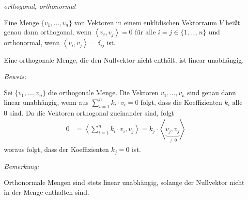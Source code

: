 
\begin{mydef}\label{orthogonal,orthonormal}\textit{orthogonal, orthonormal}

    Eine Menge $\{ v_1, \ldots, v_n \}$ von Vektoren in einem euklidischen Vektorraum $V$ heißt genau dann orthogonal,
    wenn $\left\langle v_i,v_j \right\rangle = 0$ für alle $i = j \in \{ 1, \ldots, n \}$ und orthonormal, wenn $\left\langle v_i, v_j \right\rangle = \delta_{ij}$ ist.
\end{mydef}


\begin{mylemma}
    Eine orthogonale Menge, die den Nullvektor nicht enthält, ist linear unabhängig.

    \textit{Beweis:}

    Sei $\{ v_1, \ldots, v_n \}$ die orthogonale Menge.
    Die Vektoren $v_1, \ldots, v_n$ sind genau dann linear unabhängig, wenn aus $\sum\limits_{i = 1}^n k_i \cdot v_i = 0$ folgt, dass die Koeffizienten $k_i$ alle $0$ sind.
    Da die Vektoren orthogonal zueinander sind, folgt
    \begin{align*}
        0 & = \left\langle \sum\limits_{i = 1}^n k_i \cdot v_i , v_j \right\rangle = k_j \cdot \left\langle \underbrace{v_j, v_j}_{ \neq 0} \right\rangle
    \end{align*}
    woraus folgt, dass der Koeffizienten $k_j=0$ ist.
\end{mylemma}


\textit{Bemerkung:}

Orthonormale Mengen sind stets linear unabhängig, solange der Nullvektor nicht in der Menge enthalten sind.


